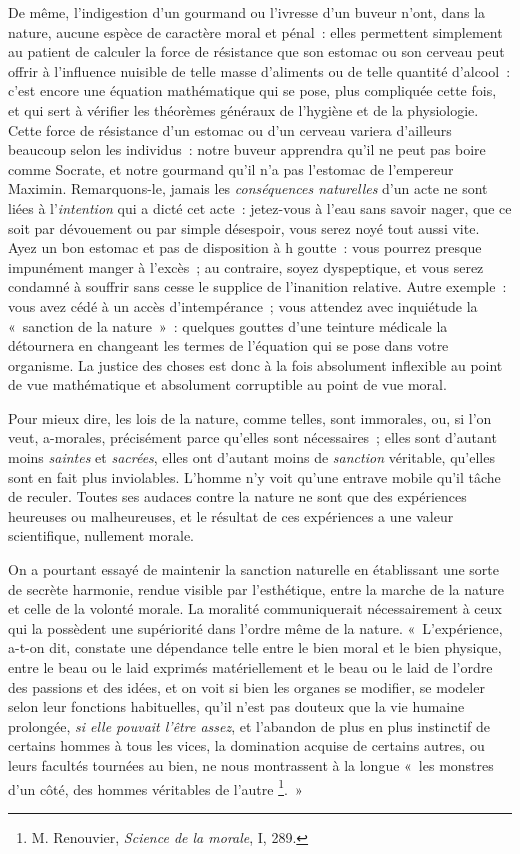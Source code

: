 \documentclass[french,twoside]{book} %
\begin{document}
De même, l’indigestion d’un gourmand ou l’ivresse d’un buveur n’ont, dans la nature, aucune espèce de caractère moral et pénal : elles permettent simplement au patient de calculer la force de résistance que son estomac ou son cerveau peut offrir à l’influence nuisible de telle masse d’aliments ou de telle quantité d’alcool : c’est encore une équation mathématique qui se pose, plus compliquée cette fois, et qui sert à vérifier les théorèmes généraux de l’hygiène et de la physiologie. Cette force de résistance d’un estomac ou d’un cerveau variera d’ailleurs beaucoup selon les individus : notre buveur apprendra qu’il ne peut pas boire comme Socrate, et notre gourmand qu’il n’a pas l’estomac de l’empereur Maximin. Remarquons-le, jamais les \emph{conséquences naturelles} d’un acte ne sont liées à l’\emph{intention} qui a dicté cet acte : jetez-vous à l’eau sans savoir nager, que ce soit par dévouement ou par simple désespoir, vous serez noyé tout aussi vite. Ayez un bon estomac et pas de disposition à h goutte : vous pourrez presque impunément manger à l’excès ; au contraire, soyez dyspeptique, et vous serez condamné à souffrir sans cesse le supplice de l’inanition relative. Autre exemple : vous avez cédé à un accès d’intempérance ; vous attendez avec inquiétude la « sanction de la nature » : quelques gouttes d’une teinture médicale la détournera en changeant les termes de l’équation qui se pose dans votre organisme. La justice des choses est donc à la fois absolument inflexible au point de vue mathématique et absolument corruptible au point de vue moral.\par
Pour mieux dire, les lois de la nature, comme telles, sont immorales, ou, si l’on veut, a-morales, précisément parce qu’elles sont nécessaires ; elles sont d’autant moins \emph{saintes} et \emph{sacrées}, elles ont d’autant moins de \emph{sanction} véritable, qu’elles sont en fait plus inviolables. L’homme n’y voit qu’une entrave mobile qu’il tâche de reculer. Toutes ses audaces contre la nature ne sont que des expériences heureuses ou malheureuses, et le résultat de ces expériences a une valeur scientifique, nullement morale.\par
On a pourtant essayé de maintenir la sanction naturelle en établissant une sorte de secrète harmonie, rendue visible par l’esthétique, entre la marche de la nature et celle de la volonté morale. La moralité communiquerait nécessairement à ceux qui la possèdent une supériorité dans l’ordre même de la nature. « L’expérience, a-t-on dit, constate une dépendance telle entre le bien moral et le bien physique, entre le beau ou le laid exprimés matériellement et le beau ou le laid de l’ordre des passions et des idées, et on voit si bien les organes se modifier, se modeler selon leur fonctions habituelles, qu’il n’est pas douteux que la vie humaine prolongée, \emph{si elle pouvait l’être assez}, et l’abandon de plus en plus instinctif de certains hommes à tous les vices, la domination acquise de certains autres, ou leurs facultés tournées au bien, ne nous montrassent à la longue « les monstres d’un côté, des hommes véritables de l’autre \footnote{M. Renouvier, \emph{Science de la morale}, I, 289.}. »\par
\end{document}
